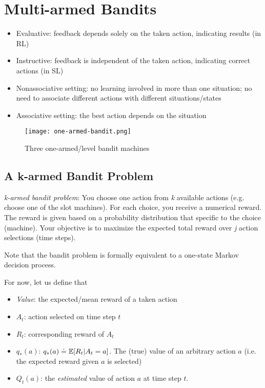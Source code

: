 \documentclass[sutton_barto_notes.tex]{subfiles}
\begin{document}
\newpage
\section{Multi-armed Bandits}
\begin{itemize}
\item Evaluative: feedback depends solely on the taken action, indicating results (in RL)
\item Instructive: feedback is independent of the taken action, indicating correct actions (in SL)
\item Nonassociative setting: no learning involved in more than one situation; no need to associate different actions with different situations/states
\item Associative setting: the best action depends on the situation
\end{itemize}

\begin{figure}[!h]
  \texttt{[image: one-armed-bandit.png]}
  \caption{Three one-armed/level bandit machines}
  \label{fig:bandit-machine}
\end{figure}

\subsection{A k-armed Bandit Problem}

\textit{k-armed bandit problem}:
You choose one action from \textit{k} available actions (e.g. choose one of the slot machines). For each choice, you receive a numerical reward. The reward is given based on a probability distribution that specific to the choice (machine). Your objective is to maximize the expected total reward over \textit{j} action selections (time steps).

Note that the bandit problem is formally equivalent to a one-state Markov decision process. 

For now, let us define that
\begin{itemize}
\item \textit{Value}: the expected/mean reward of a taken action
\item $A_t$: action selected on time step $t$
\item $R_t$: corresponding reward of $A_t$
\item $q_{*}(a)$:  $q_{*}(a) \doteq \operatorname*{\mathbb{E}}[R_t|A_t=a]$. The (true) value of an arbitrary action $a$ (i.e. the expected reward given $a$ is selected)
\item $Q_t(a)$: the \textit{estimated} value of action $a$ at time step $t$.
\end{itemize}
\end{document}
